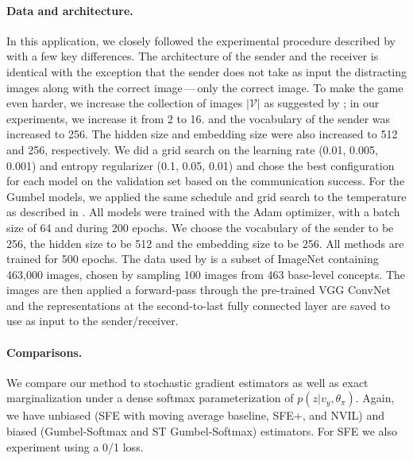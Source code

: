 \paragraph*{Data and architecture.} In this application, we closely
followed the experimental procedure described
by~\citet{Lazaridou2017} with a few key differences. The architecture
of the sender and the receiver is identical with the exception that
the sender does not take as input the distracting images along with
the correct image\,---\,only the correct image. To make the game even
harder, we increase the collection of images $|\mathcal{V}|$ as
suggested by \citet{Havrylov2017}; in our experiments, we increase it
from 2 to 16. and the vocabulary of the sender was increased to 256.
The hidden size and embedding size were also increased to 512 and 256,
respectively. We did a grid search on the learning rate (0.01, 0.005,
0.001) and entropy regularizer (0.1, 0.05, 0.01) and chose the best
configuration for each model on the validation set based on the
communication success. For the Gumbel models, we applied the same
schedule and grid search to the temperature as described in
. All models were trained with the Adam optimizer,
with a batch size of 64 and during 200 epochs. We choose the
vocabulary of the sender to be 256, the hidden size to be 512 and the
embedding size to be 256. All methods are trained for 500 epochs. The
data used by \citet{Lazaridou2017} is a subset of ImageNet containing
463,000 images, chosen by sampling 100 images from 463 base-level
concepts. The images are then applied a forward-pass through the
pre-trained VGG ConvNet~\citep{convnet} and the representations at the
second-to-last fully connected layer are saved to use as input to the
sender/receiver.

\paragraph*{Comparisons.} We compare our method to stochastic gradient
estimators as well as exact marginalization under a dense softmax
parameterization of $p (z |v_y, \theta_\pi)$. Again, we have
unbiased (SFE with moving average baseline, SFE+, and NVIL) and
biased (Gumbel-Softmax and ST Gumbel-Softmax) estimators. For SFE we
also experiment using a 0/1 loss.

